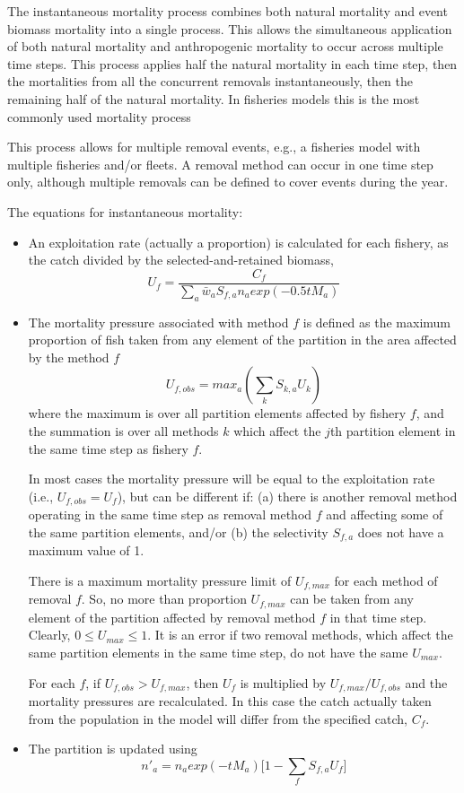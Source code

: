 The instantaneous mortality process combines both natural mortality and event biomass mortality into a single process. This allows the simultaneous application of both natural mortality and anthropogenic mortality to occur across multiple time steps. This process applies half the natural mortality in each time step, then the mortalities from all the concurrent removals instantaneously, then the remaining half of the natural mortality. In fisheries models this is the most commonly used mortality process

This process allows for multiple removal events, e.g., a fisheries model with multiple fisheries and/or fleets. A removal method can occur in one time step only, although multiple removals can be defined to cover events during the year.

The equations for instantaneous mortality:


\begin{itemize}
	\item An exploitation rate (actually a proportion) is calculated for each fishery, as the catch divided by the selected-and-retained biomass,
	$$ U_f = \frac{C_f}{\sum_a \bar{w}_a S_{f,a} n_a exp(-0.5 t M_a)}$$
	\item The mortality pressure associated with method $f$ is defined as the maximum proportion of fish taken from any element of the partition in the area affected by the method $f$
	$$ U_{f,obs} = max_a(\sum_k S_{k,a} U_k) $$
	where the maximum is over all partition elements affected by fishery $f$, and the summation is over all methods $k$ which affect the $j$th partition element in the same time step as fishery $f$.

	In most cases the mortality pressure will be equal to the exploitation rate (i.e., $U_{f,obs} = U_f$), but can be different if: (a) there is another removal method operating in the same time step as removal method $f$ and affecting some of the same partition elements, and/or (b) the selectivity $S_{f,a}$ does not have a maximum value of 1.

	There is a maximum mortality pressure limit of $U_{f,max}$ for each method of removal $f$. So, no more than proportion $U_{f,max}$ can be taken from any element of the partition affected by removal method $f$ in that time step. Clearly, $0 \leq U_{max} \leq 1$. It is an error if two removal methods, which affect the same partition elements in the same time step, do not have the same $U_{max}$.

	For each $f$, if $U_{f,obs} > U_{f,max}$, then $U_f$ is multiplied by $U_{f,max}/U_{f,obs}$ and the mortality pressures are recalculated. In this case the catch actually taken from the population in the model will differ from the specified catch, $C_f$.

	\item The partition is updated using
		$$ n'_a = n_a exp(-tM_a)\big[1 - \sum_f S_{f,a} U_f \big] $$
\end{itemize}


